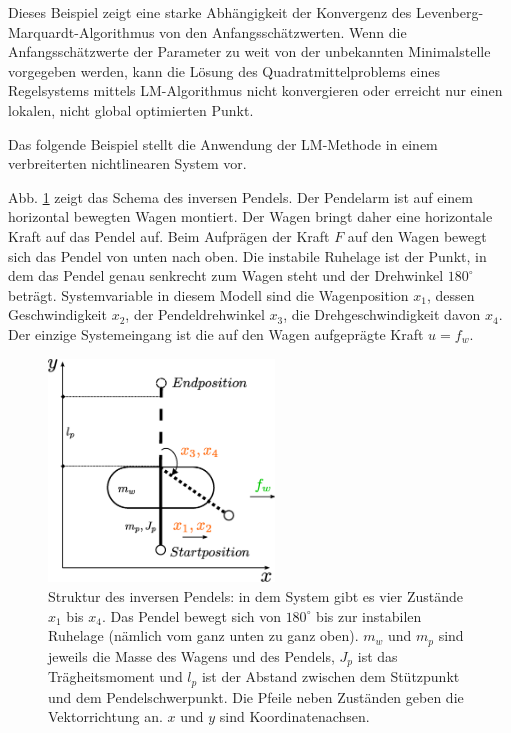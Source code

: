 Dieses Beispiel zeigt eine starke Abhängigkeit der Konvergenz des Levenberg-Marquardt-Algorithmus von den Anfangsschätzwerten. Wenn die Anfangsschätzwerte der Parameter zu weit von der unbekannten Minimalstelle vorgegeben werden, kann die Lösung des Quadratmittelproblems eines Regelsystems mittels LM-Algorithmus nicht konvergieren oder erreicht nur einen lokalen, nicht global optimierten Punkt.

Das folgende Beispiel stellt die Anwendung der LM-Methode in einem verbreiterten nichtlinearen System vor.

\begin{beispiel}\label{bp:Inverses_Pendel_System}
	Abb. \ref{fig:Inverses-Pendel} zeigt das Schema des inversen Pendels. Der Pendelarm ist auf einem horizontal bewegten Wagen montiert. Der Wagen bringt daher eine horizontale Kraft auf das Pendel auf. Beim Aufprägen der Kraft ${F}$ auf den Wagen bewegt sich das Pendel von unten nach oben. Die instabile Ruhelage ist der Punkt, in dem das Pendel genau senkrecht zum Wagen steht und der Drehwinkel $180^{\circ}$ beträgt. Systemvariable in diesem Modell sind die Wagenposition ${x}_{1}$, dessen Geschwindigkeit ${x}_{2}$, der Pendeldrehwinkel ${x}_{3}$, die Drehgeschwindigkeit davon ${x}_{4}$. Der einzige Systemeingang ist die auf den Wagen aufgeprägte Kraft $u=f_{w}$.
	\begin{figure}
		\centering
		\includegraphics[width=6cm]{bild/modul/Inverses-Pendel.eps}
		\caption[Struktur des inversen Pendels.] {Struktur des inversen Pendels: in dem System gibt es vier Zustände ${x}_{1}$ bis ${x}_{4}$. Das Pendel bewegt sich von $180^{\circ}$ bis zur instabilen Ruhelage (nämlich vom ganz unten zu ganz oben). $m_{w}$ und $m_{p}$ sind jeweils die Masse des Wagens und des Pendels, $J_{p}$ ist das Trägheitsmoment und $l_{p}$ ist der Abstand zwischen dem Stützpunkt und dem Pendelschwerpunkt. Die Pfeile neben Zuständen geben die Vektorrichtung an. $x$ und $y$ sind Koordinatenachsen.}
		\label{fig:Inverses-Pendel}
	\end{figure}  


\end{beispiel}
